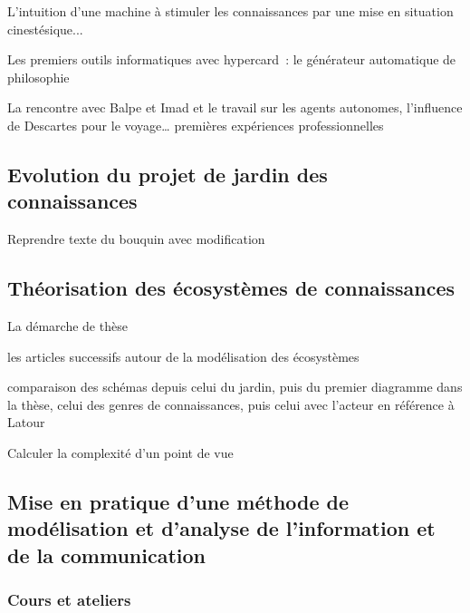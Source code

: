 \documentclass[
  letterpaper,
  DIV=11,
  numbers=noendperiod]{scrreprt}
\begin{document}
L'intuition d'une machine à stimuler les connaissances par une mise en
situation cinestésique...

Les premiers outils informatiques avec hypercard~: le générateur
automatique de philosophie

La rencontre avec Balpe et Imad et le travail sur les agents autonomes,
l'influence de Descartes pour le voyage\ldots{} premières expériences
professionnelles

\hypertarget{evolution-du-projet-de-jardin-des-connaissances}{%
\subsection{Evolution du projet de jardin des
connaissances}\label{evolution-du-projet-de-jardin-des-connaissances}}

Reprendre texte du bouquin avec modification

\hypertarget{thuxe9orisation-des-uxe9cosystuxe8mes-de-connaissances}{%
\subsection{Théorisation des écosystèmes de
connaissances}\label{thuxe9orisation-des-uxe9cosystuxe8mes-de-connaissances}}

La démarche de thèse

les articles successifs autour de la modélisation des écosystèmes

comparaison des schémas depuis celui du jardin, puis du premier
diagramme dans la thèse, celui des genres de connaissances, puis celui
avec l'acteur en référence à Latour

Calculer la complexité d'un point de vue

\hypertarget{mise-en-pratique-dune-muxe9thode-de-moduxe9lisation-et-danalyse-de-linformation-et-de-la-communication}{%
\subsection{Mise en pratique d'une méthode de modélisation et d'analyse
de l'information et de la
communication}\label{mise-en-pratique-dune-muxe9thode-de-moduxe9lisation-et-danalyse-de-linformation-et-de-la-communication}}

\hypertarget{cours-et-ateliers}{%
\subsubsection{Cours et ateliers}\label{cours-et-ateliers}}
\end{document}
